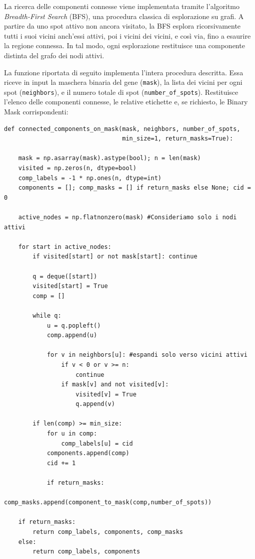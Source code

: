 La ricerca delle componenti connesse viene implementata tramite l'algoritmo \textit{Breadth-First Search} (BFS),
una procedura classica di esplorazione su grafi. 
A partire da uno spot attivo non ancora visitato, la BFS esplora ricorsivamente tutti i suoi vicini anch'essi attivi,
poi i vicini dei vicini, e così via, fino a esaurire la regione connessa. 
In tal modo, ogni esplorazione restituisce una componente distinta del grafo dei nodi attivi.

La funzione riportata di seguito implementa l'intera procedura descritta. 
Essa riceve in input la maschera binaria del gene (\texttt{mask}), la lista dei vicini per ogni spot (\texttt{neighbors}), e il numero totale di spot
(\texttt{number\_of\_spots}). 
Restituisce l'elenco delle componenti connesse, le relative etichette e, se richiesto,
le Binary Mask corrispondenti:

\begin{lstlisting}[style=mypython,
                   label=code:NN,
                   caption={Identificazione sottogeni tramite BFS},
                   basicstyle=\ttfamily\scriptsize]
def connected_components_on_mask(mask, neighbors, number_of_spots, 
                                 min_size=1, return_masks=True):
    
    mask = np.asarray(mask).astype(bool); n = len(mask)
    visited = np.zeros(n, dtype=bool)
    comp_labels = -1 * np.ones(n, dtype=int)
    components = []; comp_masks = [] if return_masks else None; cid = 0
    
    active_nodes = np.flatnonzero(mask) #Consideriamo solo i nodi attivi

    for start in active_nodes:
        if visited[start] or not mask[start]: continue

        q = deque([start])
        visited[start] = True
        comp = []

        while q:
            u = q.popleft()
            comp.append(u)
            
            for v in neighbors[u]: #espandi solo verso vicini attivi
                if v < 0 or v >= n:
                    continue
                if mask[v] and not visited[v]:
                    visited[v] = True
                    q.append(v)

        if len(comp) >= min_size:
            for u in comp:
                comp_labels[u] = cid
            components.append(comp)
            cid += 1

            if return_masks:
                comp_masks.append(component_to_mask(comp,number_of_spots))
    
    if return_masks:
        return comp_labels, components, comp_masks
    else:
        return comp_labels, components
\end{lstlisting}

